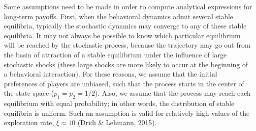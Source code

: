 \documentclass[11pt,reqno]{amsart}
\newcommand{\p}{p} %
\newcommand{\xr}{\xi} %
\begin{document}
Some assumptions need to be made in order to compute analytical expressions for long-term payoffs. First, when the behavioral dynamics admit several stable equilibria, typically the stochastic dynamics may converge to any of these stable equilibria. It may not always be possible to know which particular equilibrium will be reached by the stochastic process, because the trajectory may go out from the basin of attraction of a stable equilibrium under the influence of large stochastic shocks (these large shocks are more likely to occur at the beginning of a behavioral interaction). For these reasons, we assume that the initial preferences of players are unbiased, such that the process starts in the center of the state space ($\p_1 = \p_2 = 1/2$). Also, we assume that the process may reach each equilibrium with equal probability; in other words, the distribution of stable equilibria is uniform. Such an assumption is valid for relatively high values of the exploration rate, $\xr\approx 10$ (Dridi \& Lehmann, 2015).






\end{document}
